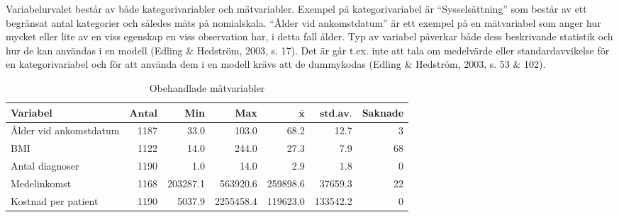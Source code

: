 Variabelurvalet består av både kategorivariabler och mätvariabler. Exempel på kategorivariabel är “Sysselsättning” som består av ett begränsat antal kategorier och således mäts på nomialskala. “Ålder vid ankomstdatum” är ett exempel på en mätvariabel som anger hur mycket eller lite av en viss egenskap en viss observation har, i detta fall ålder. Typ av variabel påverkar både dess beskrivande statistik och hur de kan användas i en modell (Edling \& Hedström, 2003, s. 17). Det är går t.ex. inte att tala om medelvärde eller standardavvikelse för en kategorivariabel och för att använda dem i en modell krävs att de dummykodas (Edling \& Hedström, 2003, s. 53 \& 102).

\begin{table}[htbp]
\centering
\caption{Obehandlade mätvariabler}
\label{tab:raw1}    
{\footnotesize
\begin{tabular}{lrrrrrr}
 \textbf{Variabel} & $\mathbf{Antal}$ & \textbf{Min} & \textbf{Max} & $\mathbf{\bar{x}}$ & $\mathbf{std.av.}$ & \textbf{Saknade} \\ 
  \hline
Ålder vid ankomstdatum & 1187 &     33.0 &     103.0 &     68.2 &     12.7 &  3 \\ 
  BMI & 1122 &     14.0 &     244.0 &     27.3 &      7.9 & 68 \\ 
  Antal diagnoser & 1190 &      1.0 &      14.0 &      2.9 &      1.8 &  0 \\ 
  Medelinkomst & 1168 & 203287.1 &  563920.6 & 259898.6 &  37659.3 & 22 \\ 
  Kostnad per patient & 1190 &   5037.9 & 2255458.4 & 119623.0 & 133542.2 &  0 \\ 
  \end{tabular}
}
\end{table}

